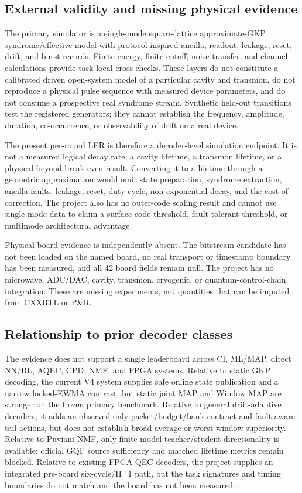 \documentclass[11pt]{article}
\begin{document}
\subsection{External validity and missing physical evidence}

The primary simulator is a single-mode square-lattice approximate-GKP
syndrome/effective model with protocol-inspired ancilla, readout, leakage,
reset, drift, and burst records.  Finite-energy, finite-cutoff, noise-transfer,
and channel calculations provide task-local cross-checks.  These layers do not
constitute a calibrated driven open-system model of a particular cavity and
transmon, do not reproduce a physical pulse sequence with measured device
parameters, and do not consume a prospective real syndrome stream.  Synthetic
held-out transitions test the registered generators; they cannot establish the
frequency, amplitude, duration, co-occurrence, or observability of drift on a
real device.

The present per-round LER is therefore a decoder-level simulation endpoint.  It
is not a measured logical decay rate, a cavity lifetime, a transmon lifetime, or
a physical beyond-break-even result.  Converting it to a lifetime through a
geometric approximation would omit state preparation, syndrome extraction,
ancilla faults, leakage, reset, duty cycle, non-exponential decay, and the cost
of correction.  The project also has no outer-code scaling result and cannot
use single-mode data to claim a surface-code threshold, fault-tolerant
threshold, or multimode architectural advantage.

Physical-board evidence is independently absent.  The bitstream candidate has
not been loaded on the named board, no real transport or timestamp boundary has
been measured, and all 42 board fields remain null.  The project has no
microwave, ADC/DAC, cavity, transmon, cryogenic, or quantum-control-chain
integration.  These are missing experiments, not quantities that can be
imputed from CXXRTL or P\&R.

\subsection{Relationship to prior decoder classes}

The evidence does not support a single leaderboard across CI, ML/MAP, direct
NN/RL, AQEC, CPD, NMF, and FPGA systems.  Relative to static GKP decoding, the
current V4 system supplies safe online state publication and a narrow
locked-EWMA contrast, but static joint MAP and Window MAP are stronger on the
frozen primary benchmark.  Relative to general drift-adaptive decoders, it adds
an observed-only packet/budget/bank contract and fault-aware tail actions, but
does not establish broad average or worst-window superiority.  Relative to
Puviani NMF, only finite-model teacher/student directionality is available;
official GQF source sufficiency and matched lifetime metrics remain blocked.
Relative to existing FPGA QEC decoders, the project supplies an integrated
pre-board six-cycle/II=1 path, but the task signatures and timing boundaries do
not match and the board has not been measured.
\end{document}
